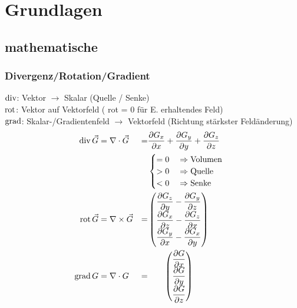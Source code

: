 \section{Grundlagen}
\subsection{mathematische}
\subsubsection*{Divergenz/Rotation/Gradient}

$\operatorname{div}$: Vektor $\rightarrow$ Skalar (Quelle / Senke)\\
$\operatorname{rot}$: Vektor auf Vektorfeld ( rot = 0 für E. erhaltendes Feld)\\
$\operatorname{grad}$: Skalar-/Gradientenfeld $\rightarrow$ Vektorfeld (Richtung stärkster Feldänderung)
\begin{align*}
    \operatorname{div} \vec{G} & = \nabla \cdot \vec{G}  & = & \dfrac{\partial G_x}{\partial x} + \dfrac{\partial G_y}{\partial y} + \dfrac{\partial G_z}{\partial z} \\
                   &                         &   & \begin{cases}
                                                       = 0 \quad\Rightarrow \textnormal{Volumen} \\
                                                       > 0 \quad\Rightarrow \textnormal{Quelle}  \\
                                                       < 0 \quad\Rightarrow \textnormal{Senke}
                                                   \end{cases}                                                              \\
    \operatorname{rot} \vec{G} & = \nabla \times \vec{G} & = &
    \begin{pmatrix}
        \dfrac{\partial G_z}{\partial y} - \dfrac{\partial G_y}{\partial z} \\
        \dfrac{\partial G_x}{\partial z} - \dfrac{\partial G_z}{\partial x} \\
        \dfrac{\partial G_y}{\partial x} - \dfrac{\partial G_x}{\partial y}
    \end{pmatrix}                                                                                   \\
    \operatorname{grad} G      & = \nabla \cdot G        & = & \hspace{4.5ex}
    \begin{pmatrix}
        \dfrac{\partial G}{\partial x} \\
        \dfrac{\partial G}{\partial y} \\
        \dfrac{\partial G}{\partial z}
    \end{pmatrix}
\end{align*}


